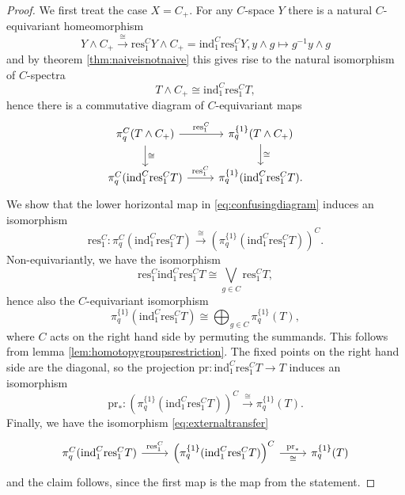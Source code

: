 \begin{proof}
We first treat the case $X = C_+$. For any $C$-space $Y$
there is a natural $C$-equivariant homeomorphism
\begin{equation}\label{eq:untwist}
Y\wedge C_+\xrightarrow{\cong} \mathrm{res}^C_1 Y \wedge C_+ = 
\mathrm{ind}^C_1 \mathrm{res}^C_1 Y, y\wedge g\mapsto g^{-1}y\wedge g
\end{equation}
and by theorem \ref{thm:naiveisnotnaive} this gives rise to the natural isomorphism of $C$-spectra
\[T\wedge C_+\cong \mathrm{ind}^C_1 \mathrm{res}^C_1 T,\]
hence there is a commutative diagram of $C$-equivariant maps
\begin{equation}\label{eq:confusingdiagram}
\begin{tikzcd}
\pi_q^C(T\wedge C_+)\arrow{d}{\cong}\arrow{r}{\mathrm{res}^C_1}
&\pi_q^{\{1\}}(T\wedge C_+)\arrow{d}{\cong}\\
\pi_q^C(\mathrm{ind}^C_1 \mathrm{res}^C_1 T)\arrow{r}{\mathrm{res}^C_1}
&\pi_q^{\{1\}}(\mathrm{ind}^C_1 \mathrm{res}^C_1 T).
\end{tikzcd}
\end{equation}
We show that 
the lower horizontal map in \eqref{eq:confusingdiagram} induces an isomorphism
\begin{equation}\label{eq:restriction}
\mathrm{res}^C_1:\pi_q^C(\mathrm{ind}^C_1 \mathrm{res}^C_1 T)
\xrightarrow{\cong} \left(\pi_q^{\{1\}}( \mathrm{ind}^C_1 \mathrm{res}^C_1 T)\right)^C.
\end{equation}
Non-equivariantly, we have the isomorphism 
\[
\mathrm{res}^C_1 \mathrm{ind}^C_1 \mathrm{res}^C_1 T\cong \bigvee_{g\in C} \mathrm{res}^C_1 T,\]
hence also the $C$-equivariant isomorphism
\[
\pi_q^{\{1\}}( \mathrm{ind}^C_1 \mathrm{res}^C_1 T)\cong \bigoplus_{g\in C} \pi_q^{\{1\}}( T),
\]
where $C$ acts on the right hand side by permuting the summands. This follows from lemma
\ref{lem:homotopygroupsrestriction}.
The fixed points on the right hand side are the diagonal, so the projection
$\mathrm{pr}: \mathrm{ind}^C_1 \mathrm{res}^C_1 T \to T$ induces an isomorphism
\[
\mathrm{pr}_\ast:\left(\pi^{\{1\}}_q( \mathrm{ind}^C_1 \mathrm{res}^C_1 T)\right)^C\xrightarrow{\cong}
\pi_q^{\{1\}}( T).
\]
Finally, we have the isomorphism  \eqref{eq:externaltransfer}
\[
\begin{tikzcd}
\pi_q^C(\mathrm{ind}^C_1 \mathrm{res}^C_1 T)
\arrow{r}{\mathrm{res}^C_1}
&\left( \pi_q^{\{1\}}( \mathrm{ind}^C_1 \mathrm{res}^C_1 T)\right)^C
\arrow{r}[swap]{\cong}{\mathrm{pr}_\ast} 
&\pi_q^{\{1\}}( T)
\end{tikzcd}
\]
and the claim follows, since the first map is the map from the statement.


\end{proof}
